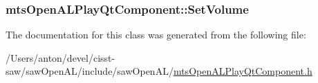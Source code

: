 \subsubsection[{Set\+Volume}]{ mts\+Open\+A\+L\+Play\+Qt\+Component\+::\+Set\+Volume}\label{classmts_open_a_l_play_qt_component_abf083f38245931ac88a894bd195a5fe5}


The documentation for this class was generated from the following file\+:\begin{DoxyCompactItemize}
\item 
/\+Users/anton/devel/cisst-\/saw/saw\+Open\+A\+L/include/saw\+Open\+A\+L/\hyperlink{mts_open_a_l_play_qt_component_8h}{mts\+Open\+A\+L\+Play\+Qt\+Component.\+h}\end{DoxyCompactItemize}
